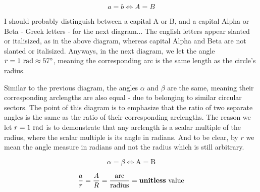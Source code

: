 \documentclass{article}
\begin{document}
\[a=b\iff A=B\]

I should probably distinguish between a capital A or B, and a capital Alpha or Beta - Greek letters - for the next diagram... The english letters appear slanted or italisized, as in the above diagram, whereas capital Alpha and Beta are not slanted or italisized. Anyways, in the next diagram, we let the angle $r=1\textnormal{ rad}\approx57^\circ$, meaning the corresponding arc is the same length as the circle's radius.

\begin{center}
\end{center}

Similar to the previous diagram, the angles $\alpha$ and $\beta$ are the same, meaning their corresponding arclengths are also equal - due to belonging to similar circular sectors. The point of this diagram is to emphasize that the ratio of two separate angles is the same as the ratio of their corresponding arclengths. The reason we let $r=1\textnormal{ rad}$ is to demonstrate that any arclength is a scalar multiple of the radius, where the scalar multiple is its angle in radians. And to be clear, by $r$ we mean the angle measure in radians and not the radius which is still arbitrary.

\[\alpha=\beta\iff\mathrm{A}=\mathrm{B}\]

\[\frac{a}{r}=\frac{A}{R}=\frac{\textnormal{arc}}{\textnormal{radius}}=\textnormal{{\bf{}unitless} value}\]
\end{document}
